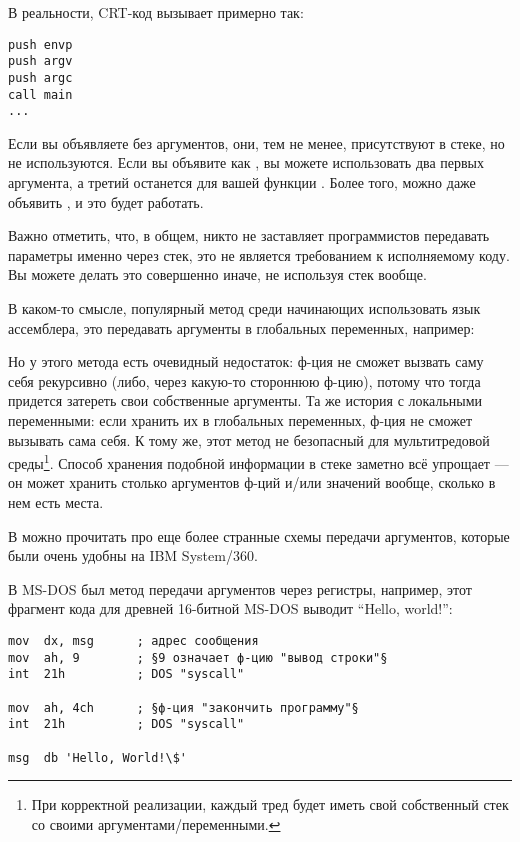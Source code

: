 В реальности, \ac{CRT}-код вызывает \main примерно так:
	
\begin{lstlisting}[style=customasmx86]
push envp
push argv
push argc
call main
...
\end{lstlisting}

Если вы объявляете \main без аргументов, они, тем не менее, присутствуют в стеке, но не используются.
Если вы объявите \main как , 
вы можете использовать два первых аргумента, а третий останется для вашей функции .
Более того, можно даже объявить , и это будет работать.


Важно отметить, что, в общем, никто не заставляет программистов передавать параметры именно через стек, это не является требованием к исполняемому коду.
Вы можете делать это совершенно иначе, не используя стек вообще.

В каком-то смысле, популярный метод среди начинающих использовать язык ассемблера,
это передавать аргументы в глобальных переменных, например:



Но у этого метода есть очевидный недостаток: ф-ция  не сможет вызвать саму себя рекурсивно (либо, через
какую-то стороннюю ф-цию),
потому что тогда придется затереть свои собственные аргументы.
Та же история с локальными переменными: если хранить их в глобальных переменных, ф-ция не сможет вызывать сама себя.
К тому же, этот метод не безопасный для мультитредовой среды\footnote{При корректной реализации,
каждый тред будет иметь свой собственный стек со своими аргументами/переменными.}.
Способ хранения подобной информации в стеке заметно всё упрощает ---
он может хранить столько аргументов ф-ций и/или значений вообще,
сколько в нем есть места.

В  можно прочитать про еще более странные схемы передачи аргументов,
которые были очень удобны на IBM System/360.


В MS-DOS был метод передачи аргументов через регистры, например, этот фрагмент кода для древней 16-битной MS-DOS
выводит ``Hello, world!'':

\begin{lstlisting}[style=customasmx86]
mov  dx, msg      ; адрес сообщения
mov  ah, 9        ; §9 означает ф-цию "вывод строки"§
int  21h          ; DOS "syscall"

mov  ah, 4ch      ; §ф-ция "закончить программу"§
int  21h          ; DOS "syscall"

msg  db 'Hello, World!\$'
\end{lstlisting}


